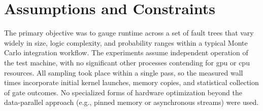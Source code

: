 \section{Assumptions and Constraints}
The primary objective was to gauge runtime across a set of fault trees that vary widely in size, logic complexity, and probability ranges within a typical Monte Carlo integration workflow. The experiments assume independent operation of the test machine, with no significant other processes contending for \acrshort{gpu} or \acrshort{cpu} resources. All sampling took place within a single pass, so the measured wall times incorporate initial kernel launches, memory copies, and statistical collection of gate outcomes. No specialized forms of hardware optimization beyond the data-parallel approach (e.g., pinned memory or asynchronous streams) were used.
